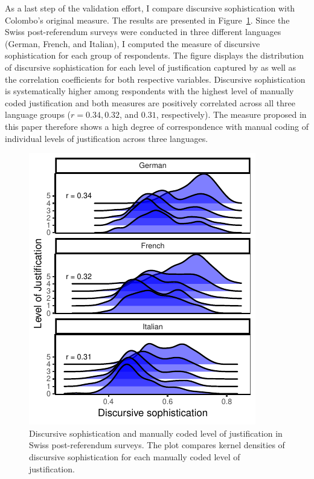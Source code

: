 \documentclass[12pt]{article}
\begin{document}
As a last step of the validation effort, I compare discursive sophistication with Colombo's \citeyearpar{colombo2016justifications} original measure. The results are presented in Figure~\ref{fig:swiss_ggridges}. Since the Swiss post-referendum surveys were conducted in three different languages (German, French, and Italian), I computed the measure of discursive sophistication for each group of respondents. The figure displays the distribution of discursive sophistication for each level of justification captured by \citet{colombo2016justifications} as well as the correlation coefficients for both respective variables. Discursive sophistication is systematically higher among respondents with the highest level of manually coded justification and both measures are positively correlated across all three language groups ($r=0.34, 0.32$, and $0.31$, respectively). The measure proposed in this paper therefore shows a high degree of correspondence with manual coding of individual levels of justification across three languages.


\begin{figure}[h]\centering
\includegraphics[scale=1]{../fig/swiss_ggridges.pdf}
\caption{Discursive sophistication and manually coded level of justification \citep{colombo2016justifications} in Swiss post-referendum surveys. The plot compares kernel densities of discursive sophistication for each manually coded level of justification.}\label{fig:swiss_ggridges}
\end{figure}
\end{document}
